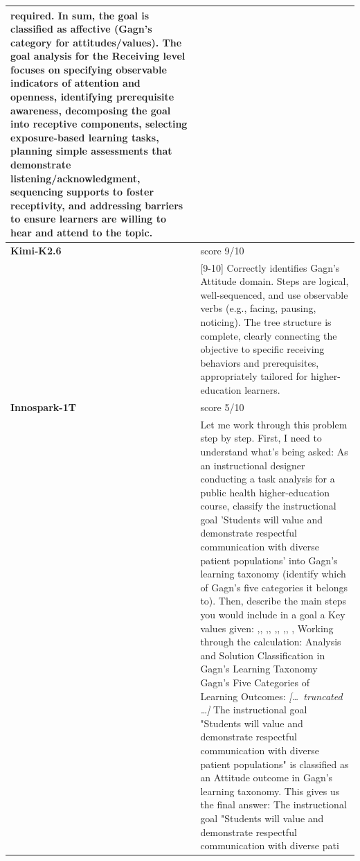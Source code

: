 \begin{longtable}{@{}l p{12.5cm}@{}}
required. \newline In sum, the goal is classified as affective (Gagn's category for attitudes/values). The goal analysis for the Receiving level focuses on specifying observable indicators of attention and openness, identifying prerequisite awareness, decomposing the goal into receptive components, selecting exposure-based learning tasks, planning simple assessments that demonstrate listening/acknowledgment, sequencing supports to foster receptivity, and addressing barriers to ensure learners are willing to hear and attend to the topic. \\
  \midrule
  \textbf{Kimi-K2.6} & score 9/10 \\
  & [9-10] Correctly identifies Gagn's Attitude domain. Steps are logical, well-sequenced, and use observable verbs (e.g., facing, pausing, noticing). The tree structure is complete, clearly connecting the objective to specific receiving behaviors and prerequisites, appropriately tailored for higher-education learners. \\
  \textbf{Innospark-1T} & score 5/10 \\
  & Let me work through this problem step by step. \newline First, I need to understand what's being asked: As an instructional designer conducting a task analysis for a public health higher-education course, classify the instructional goal 'Students will value and demonstrate respectful communication with diverse patient populations' into Gagn's learning taxonomy (identify which of Gagn's five categories it belongs to). Then, describe the main steps you would include in a goal a \newline Key values given: ,, ,, ,, ,, , \newline Working through the calculation: Analysis and Solution \newline Classification in Gagn's Learning Taxonomy \newline Gagn's Five Categories of Learning Outcomes: \newline \textit{[\ldots\ truncated \ldots]} \newline The instructional goal "Students will value and demonstrate respectful communication with diverse patient populations" is classified as an Attitude outcome in Gagn's learning taxonomy. \newline This gives us the final answer: The instructional goal "Students will value and demonstrate respectful communication with diverse pati \\

\end{longtable}
